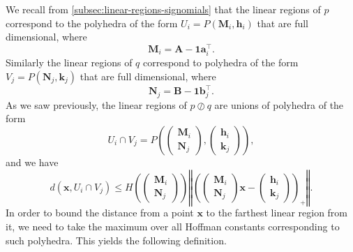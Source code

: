 \documentclass[10pt]{article}
\theoremstyle{definition}
\newtheorem{definition}[theorem]{Definition}
\theoremstyle{remark}
\renewcommand{\vec}[1]{\mathbf{#1}}
\def\va{{\vec{a}}}
\def\vb{{\vec{b}}}
\def\vh{{\vec{h}}}
\def\vk{{\bm{k}}}
\def\vx{{\vec{x}}}
\def\mA{{\bm{A}}}
\def\mB{{\bm{B}}}
\def\mM{{\bm{M}}}
\def\mN{{\bm{N}}}
\begin{document}
We recall from \cref{subsec:linear-regions-signomials} that the linear regions of $p$ correspond to the polyhedra of the form $U_i = P(\mM_i, \vh_i)$
that are full dimensional, where
$$
\mM_i = \mA - \mathbf 1\va_i^{\top}.
$$
Similarly the linear regions of $q$ correspond to polyhedra of the form
$V_j = P(\mN_j, \vk_j)$ that are full dimensional, where
$$
\mN_j = \mB - \mathbf 1\vb_j^{\top}.
$$
As we saw previously, the linear regions of $p \oslash q$ are unions of polyhedra of the form
$$
U_i \cap V_j = P\left(\begin{pmatrix}
            \mM_i \\
            \mN_j
        \end{pmatrix}, \begin{pmatrix}
            \vh_i \\
            \vk_j
        \end{pmatrix} \right),
$$
and we have
$$
d(\vx, U_i \cap V_j) \le H\left(\begin{pmatrix}
            \mM_i \\
            \mN_j
        \end{pmatrix} \right) \left\Vert \left(
        \begin{pmatrix}
            \mM_i \\
            \mN_j
        \end{pmatrix} \vx - \begin{pmatrix}
            \vh_i \\
            \vk_j
        \end{pmatrix} \right)_+ \right\Vert.
$$
In order to bound the distance from a point $\vx$ to the farthest linear region from it, we need to take the maximum over all Hoffman constants corresponding to such polyhedra. This yields the following definition.

\end{document}
